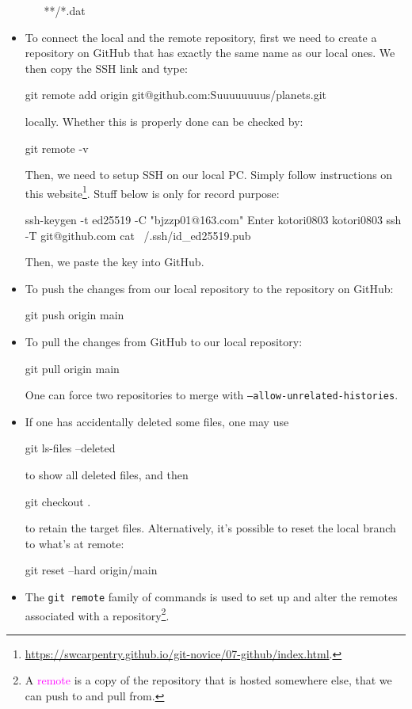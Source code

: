 \documentclass[UTF8]{book}
\newcommand{\code}[1]{\colorbox{codegray}{\texttt{#1}}}
\begin{document}
\begin{itemize}
\begin{itemize}
\begin{bash}
**/*.dat
\end{bash}
\end{itemize}
\item To connect the local and the remote repository, first we need to create a repository on GitHub that has exactly the same name as our local ones. We then copy the SSH link and type:
\begin{bash}
git remote add origin git@github.com:Suuuuuuuus/planets.git
\end{bash}
locally. Whether this is properly done can be checked by:
\begin{bash}
git remote -v
\end{bash}
Then, we need to setup SSH on our local PC. Simply follow instructions on this website\footnote{\url{https://swcarpentry.github.io/git-novice/07-github/index.html}.}. Stuff below is only for record purpose:
\begin{bash}
ssh-keygen -t ed25519 -C "bjzzp01@163.com"
Enter
kotori0803
kotori0803
ssh -T git@github.com
cat ~/.ssh/id_ed25519.pub
\end{bash}
Then, we paste the key into GitHub.
\item To push the changes from our local repository to the repository on GitHub:
\begin{bash}
git push origin main
\end{bash}
\item To pull the changes from GitHub to our local repository:
\begin{bash}
git pull origin main
\end{bash}
One can force two repositories to merge with \code{--allow-unrelated-histories}.
\item If one has accidentally deleted some files, one may use
\begin{bash}
git ls-files --deleted
\end{bash}
to show all deleted files, and then
\begin{bash}
git checkout .
\end{bash}
to retain the target files. Alternatively, it's possible to reset the local branch to what's at remote:
\begin{bash}
git reset --hard origin/main
\end{bash}
\item The \code{git remote} family of commands is used to set up and alter the remotes associated with a repository\footnote{A \textcolor{magenta}{remote} is a copy of the repository that is hosted somewhere else, that we can push to and pull from.}.

\end{itemize}
\end{document}
